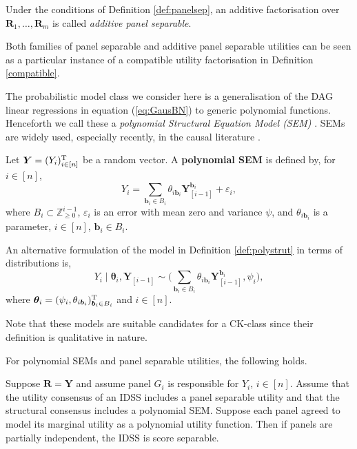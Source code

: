 \begin{definition}
Under the conditions of Definition \ref{def:panelsep}, an additive factorisation over $\bm{R}_1,\dots, \bm{R}_m$ is called \emph{additive panel separable}.
\end{definition}

Both families of panel separable and additive panel separable utilities can be seen as a particular instance of a compatible utility factorisation in Definition \ref{compatible}. 

The probabilistic model class we consider here is a generalisation of the DAG linear regressions in equation (\ref{eq:GausBN}) to generic polynomial functions. Henceforth we call these a \textit{polynomial Structural Equation Model (SEM)} \citep[see e.g.][]{Bollen1998,Ullman2003,Wall2000}. SEMs are widely used, especially recently, in the causal literature \citep{Pearl2000}. 

\begin{definition}
\label{def:polystrut}
Let $\bm{Y}=(Y_i)^{\textnormal{T}}_{i\in[n]}$ be a random vector. A \textbf{polynomial SEM} is defined by, for $i\in[n]$,
\begin{equation*}
Y_i=\sum_{\bm{b}_i\in B_i}\theta_{i\bm{b}_i}\bm{Y}_{[i-1]}^{\bm{b}_i}+\varepsilon_i,
\end{equation*}
where $B_i\subset \mathbb{Z}^{i-1}_{\geq 0}$, $\varepsilon_i$ is an error with mean zero and variance $\psi$, and $\theta_{i\bm{b}_i}$ is a parameter, $i\in[n]$, $\bm{b}_i\in B_i$.
\end{definition}

An alternative formulation of the model in Definition \ref{def:polystrut} in terms of distributions is,  
\begin{equation*}
Y_i\;|\;\bm{\theta}_i,\bm{Y}_{[i-1]}\sim \Big(\sum_{\bm{b}_i\in B_i}\theta_{i\bm{b}_i}\bm{Y}_{[i-1]}^{\bm{b}_i},\psi_i\Big),
\end{equation*}
where $\bm{\theta}_i=(\psi_i,\theta_{i\bm{b}_i})^{\textnormal{T}}_{\bm{b}_i\in B_i}$ and $i\in[n]$.

Note that these models are suitable candidates for a CK-class since their definition is qualitative in nature.
 
For polynomial SEMs and panel separable utilities, the following holds.
\begin{theorem}
\label{theo:ciao}
Suppose $\bm{R}=\bm{Y}$ and assume panel $G_i$ is responsible for $Y_i$, $i\in[n]$. Assume that the utility consensus of an IDSS includes a panel separable utility and that the structural consensus includes a polynomial SEM. Suppose each panel agreed to model its marginal utility as a polynomial utility function. Then if panels are partially independent, the IDSS is score separable.
\end{theorem}

